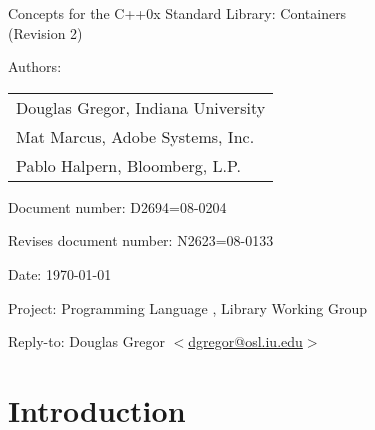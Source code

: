 \documentclass[american,twoside]{book}
\begin{document}
\raggedbottom

\begin{titlepage}
\begin{center}
\huge
Concepts for the C++0x Standard Library: Containers\\
(Revision 2)
\end{center}

\normalsize

\vspace{0.5in}
\par\noindent Authors: 
\begin{tabular}[t]{l}
Douglas Gregor, Indiana University \\
Mat Marcus, Adobe Systems, Inc.\\
Pablo Halpern,  Bloomberg, L.P.
\end{tabular}\vspace{-6pt}
\par\noindent Document number: D2694=08-0204\vspace{-6pt}
\par\noindent Revises document number: N2623=08-0133\vspace{-6pt}
\par\noindent Date: \today\vspace{-6pt}
\par\noindent Project: Programming Language \Cpp{}, Library Working Group\vspace{-6pt}
\par\noindent Reply-to: Douglas Gregor $<$\href{mailto:dgregor@osl.iu.edu}{dgregor@osl.iu.edu}$>$\vspace{-6pt}

\section*{Introduction}
\end{titlepage}

\pagestyle{fancy}
\fancyhead[LE,RO]{\textbf{\rightmark}}
\fancyhead[RE]{\textbf{\leftmark\hspace{1em}\thepage}}
\fancyhead[LO]{\textbf{\thepage\hspace{1em}\leftmark}}


\renewcommand{\sectionmark}[1]{\markright{\thesection\hspace{1em}#1}}
\renewcommand{\chaptermark}[1]{\markboth{#1}{}}
\end{document}
